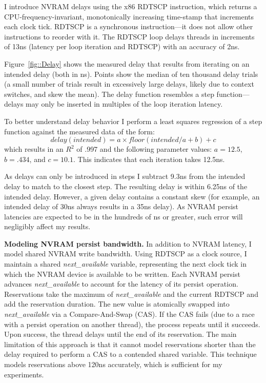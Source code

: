 I introduce NVRAM delays using the x86 RDTSCP instruction, which returns a CPU-frequency-invariant, monotonically increasing time-stamp that increments each clock tick.
RDTSCP is a synchronous instruction---it does not allow other instructions to reorder with it.
The RDTSCP loop delays threads in increments of 13ns (latency per loop iteration and RDTSCP) with an accuracy of 2ns.


Figure~\ref{fig::Delay} shows the measured delay that results from iterating on an intended delay (both in ns).
Points show the median of ten thousand delay trials (a small number of trials result in excessively large delays, likely due to context switches, and skew the mean).
The delay function resembles a step function---delays may only be inserted in multiples of the loop iteration latency.

To better understand delay behavior I perform a least squares regression of a step function against the measured data of the form:
$$delay(intended) = a \times floor(intended / a + b) + c$$
which results in an $R^2$ of .997 and the following parameter values: $a = 12.5$, $b=.434$, and $c=10.1$.
This indicates that each iteration takes 12.5ns.

As delays can only be introduced in steps I subtract 9.3ns from the intended delay to match to the closest step.
The resulting delay is within 6.25ns of the intended delay.
However, a given delay contains a constant skew (for example, an intended delay of 30ns always results in a 35ns delay).
As NVRAM persist latencies are expected to be in the hundreds of ns or greater, such error will negligibly affect my results.

\textbf{Modeling NVRAM persist bandwidth.}
In addition to NVRAM latency, I model shared NVRAM write bandwidth.
Using RDTSCP as a clock source, I maintain a shared \emph{next\_available} variable, representing the next clock tick in which the NVRAM device is available to be written.
Each NVRAM persist advances \emph{next\_available} to account for the latency of its persist operation.
Reservations take the maximum of \emph{next\_available} and the current RDTSCP and add the reservation duration.
The new value is atomically swapped into \emph{next\_available} via a Compare-And-Swap (CAS).
If the CAS fails (due to a race with a persist operation on another thread), the process repeats until it succeeds.
Upon success, the thread delays until the end of its reservation.
The main limitation of this approach is that it cannot model reservations shorter than the delay required to perform a CAS to a contended shared variable.
This technique models reservations above 120ns accurately, which is sufficient for my experiments.

